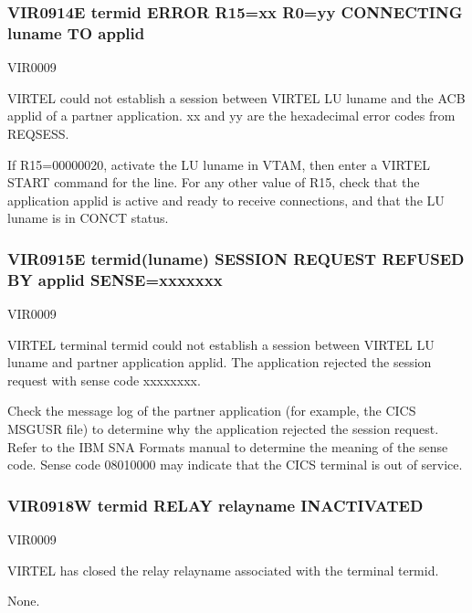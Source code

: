 \documentclass[letterpaper,10pt,english]{sphinxmanual}
\begin{document}
\subsubsection{VIR0914E termid ERROR R15=xx R0=yy CONNECTING luname TO applid}
\label{\detokenize{messages:vir0914e-termid-error-r15-xx-r0-yy-connecting-luname-to-applid}}\begin{description}
\sphinxAtStartPar
VIR0009

\sphinxAtStartPar
VIRTEL could not establish a session between VIRTEL LU luname and the ACB applid of a partner application. xx and yy are the hexadecimal error codes from REQSESS.

\sphinxAtStartPar
If R15=00000020, activate the LU luname in VTAM, then enter a VIRTEL START command for the line. For any other value of R15, check that the application applid is active and ready to receive connections, and that the LU luname is in CONCT status.

\end{description}


\subsubsection{VIR0915E termid(luname) SESSION REQUEST REFUSED BY applid SENSE=xxxxxxx}
\label{\detokenize{messages:vir0915e-termid-luname-session-request-refused-by-applid-sense-xxxxxxx}}\begin{description}
\sphinxAtStartPar
VIR0009

\sphinxAtStartPar
VIRTEL terminal termid could not establish a session between VIRTEL LU luname and partner application applid. The application rejected the session request with sense code xxxxxxxx.

\sphinxAtStartPar
Check the message log of the partner application (for example, the CICS MSGUSR file) to determine why the application rejected the session request. Refer to the IBM SNA Formats manual to determine the meaning of the sense code. Sense code 08010000 may indicate that the CICS terminal is out of service.

\end{description}


\subsubsection{VIR0918W termid RELAY relayname INACTIVATED}
\label{\detokenize{messages:vir0918w-termid-relay-relayname-inactivated}}\begin{description}
\sphinxAtStartPar
VIR0009

\sphinxAtStartPar
VIRTEL has closed the relay relayname associated with the terminal termid.

\sphinxAtStartPar
None.

\end{description}
\end{document}
